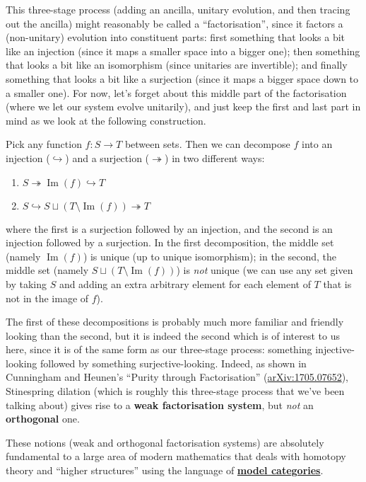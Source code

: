 \documentclass[fleqn]{article}
\providecommand{\tightlist}{%
  \setlength{\itemsep}{0pt}\setlength{\parskip}{0pt}}
\newenvironment{technical}{\noindent}{\medskip}
\begin{document}
\begin{technical}
This three-stage process (adding an ancilla, unitary evolution, and then tracing out the ancilla) might reasonably be called a ``factorisation'', since it factors a (non-unitary) evolution into constituent parts: first something that looks a bit like an injection (since it maps a smaller space into a bigger one); then something that looks a bit like an isomorphism (since unitaries are invertible); and finally something that looks a bit like a surjection (since it maps a bigger space down to a smaller one).
For now, let's forget about this middle part of the factorisation (where we let our system evolve unitarily), and just keep the first and last part in mind as we look at the following construction.

Pick any function \(f\colon S\to T\) between sets.
Then we can decompose \(f\) into an injection (\(\hookrightarrow\)) and a surjection (\(\twoheadrightarrow\)) in two different ways:

\begin{enumerate}
\def\labelenumi{\arabic{enumi}.}
\tightlist
\item
  \(S\twoheadrightarrow\operatorname{Im}(f)\hookrightarrow T\)
\item
  \(S\hookrightarrow S\sqcup(T\setminus\operatorname{Im}(f))\twoheadrightarrow T\)
\end{enumerate}

where the first is a surjection followed by an injection, and the second is an injection followed by a surjection.
In the first decomposition, the middle set (namely \(\operatorname{Im}(f)\)) is unique (up to unique isomorphism); in the second, the middle set (namely \(S\sqcup(T\setminus\operatorname{Im}(f))\)) is \emph{not} unique (we can use any set given by taking \(S\) and adding an extra arbitrary element for each element of \(T\) that is not in the image of \(f\)).

The first of these decompositions is probably much more familiar and friendly looking than the second, but it is indeed the second which is of interest to us here, since it is of the same form as our three-stage process: something injective-looking followed by something surjective-looking.
Indeed, as shown in Cunningham and Heunen's ``Purity through Factorisation'' (\href{https://arxiv.org/abs/1705.07652}{arXiv:1705.07652}), Stinespring dilation (which is roughly this three-stage process that we've been talking about) gives rise to a \textbf{weak factorisation system}, but \emph{not} an \textbf{orthogonal} one.

These notions (weak and orthogonal factorisation systems) are absolutely fundamental to a large area of modern mathematics that deals with homotopy theory and ``higher structures'' using the language of \href{https://en.wikipedia.org/wiki/Model_category}{\textbf{model categories}}.

\end{technical}
\end{document}
